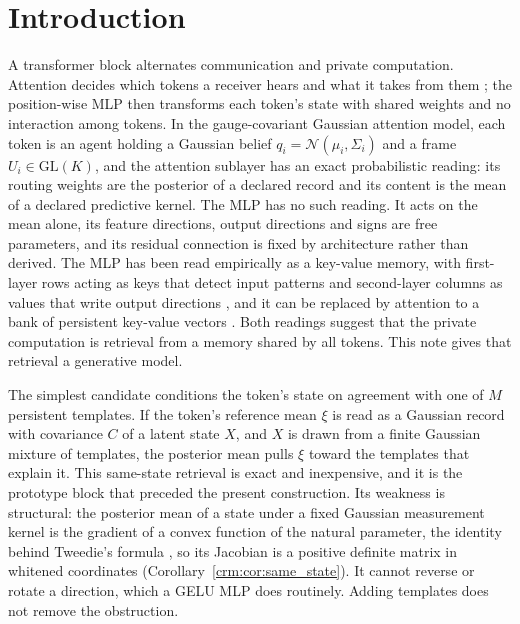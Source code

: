 \documentclass[11pt]{article}
\theoremstyle{definition}
\theoremstyle{remark}
\providecommand{\GL}{\mathrm{GL}}
\newcommand{\Gauss}{\mathcal N}
\begin{document}
\section{Introduction}
\label{crm:sec:intro}

A transformer block alternates communication and private computation. Attention decides which tokens a receiver hears and what it takes from them \citep{vaswani2017attention}; the position-wise MLP then transforms each token's state with shared weights and no interaction among tokens. In the gauge-covariant Gaussian attention model, each token is an agent holding a Gaussian belief $q_i=\Gauss(\mu_i,\Sigma_i)$ and a frame $U_i\in\GL(K)$, and the attention sublayer has an exact probabilistic reading: its routing weights are the posterior of a declared record and its content is the mean of a declared predictive kernel. The MLP has no such reading. It acts on the mean alone, its feature directions, output directions and signs are free parameters, and its residual connection is fixed by architecture rather than derived. The MLP has been read empirically as a key-value memory, with first-layer rows acting as keys that detect input patterns and second-layer columns as values that write output directions \citep{Geva2021KeyValue}, and it can be replaced by attention to a bank of persistent key-value vectors \citep{Sukhbaatar2019Persistent}. Both readings suggest that the private computation is retrieval from a memory shared by all tokens. This note gives that retrieval a generative model.

The simplest candidate conditions the token's state on agreement with one of $M$ persistent templates. If the token's reference mean $\xi$ is read as a Gaussian record with covariance $C$ of a latent state $X$, and $X$ is drawn from a finite Gaussian mixture of templates, the posterior mean pulls $\xi$ toward the templates that explain it. This same-state retrieval is exact and inexpensive, and it is the prototype block that preceded the present construction. Its weakness is structural: the posterior mean of a state under a fixed Gaussian measurement kernel is the gradient of a convex function of the natural parameter, the identity behind Tweedie's formula \citep{Robbins1956Empirical,Efron2011Tweedie}, so its Jacobian is a positive definite matrix in whitened coordinates (Corollary~\ref{crm:cor:same_state}). It cannot reverse or rotate a direction, which a GELU MLP does routinely. Adding templates does not remove the obstruction.
\end{document}
